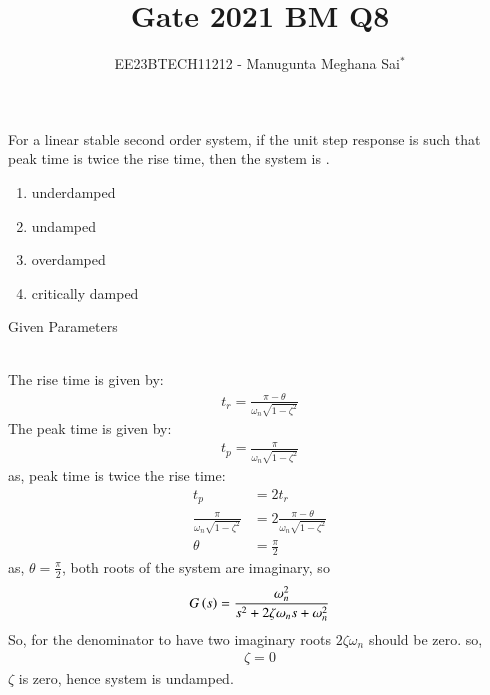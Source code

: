 \documentclass[journal,12pt,onecolumn]{IEEEtran}
\theoremstyle{remark}
\begin{document}
    
    
    \vspace{3cm}
    
    \title{Gate 2021 BM Q8}
    \author{EE23BTECH11212 - Manugunta Meghana Sai$^{*}$%
    }
    \maketitle
    \bigskip
    
    \renewcommand{\thefigure}{\theenumi}
    \renewcommand{\thetable}{\theenumi}
    
    \vspace{3cm}
    
    For a linear stable second order system, if the unit step response is such that peak time is twice the rise time, then the system is . 
    \begin{enumerate}
    \item underdamped\\
    \item undamped\\
    \item overdamped\\
    \item critically damped\\
    \end{enumerate}
    \solution
    \begin{table}[h!]
 	\centering
 	\resizebox{6 cm}{!}{
 		
 	}
 	\caption{Given Parameters}
 	\label{tab:msmBMgate8tab1}
     \end{table} 
    \\The rise time is given by:
    \begin{align}
    t_{r} = \frac{\pi-\theta}{\omega_{n} \sqrt{1-\zeta^{2}}}
    \end{align}
    The peak time is given by:
    \begin{align}
    t_{p} = \frac{\pi}{\omega_{n} \sqrt{1-\zeta^{2}}}
    \end{align}
    as, peak time is twice the rise time:
    \begin{align}
    t_{p} &= 2t_{r}\\
    \frac{\pi}{\omega_{n} \sqrt{1-\zeta^{2}}} &= 2\frac{\pi-\theta}{\omega_{n} \sqrt{1-\zeta^{2}}}\\
    \theta &= \frac{\pi}{2}
    \end{align}
    as, $\theta = \frac{\pi}{2}$, both roots of the system are imaginary, so 
    \begin{align}
    G\left(s\right) = \frac{\omega_n^2}{s^2 + 2\zeta\omega_n s + \omega_n^2}
    \end{align}
    So, for the denominator to have two imaginary roots $2\zeta\omega_n$ should be zero.
    so,
    \begin{align}
    \zeta = 0
    \end{align}
    $\zeta$ is zero, hence system is undamped. 
\end{document}
